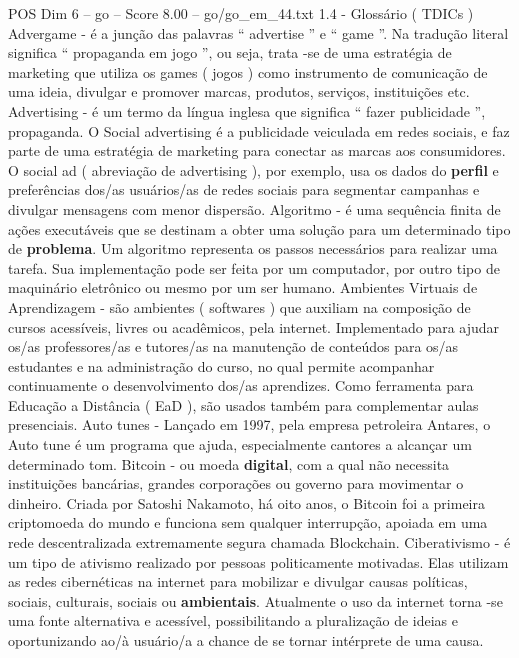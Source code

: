 \begin{textsample}{POS Dim 6 – go – Score 8.00 – go/go\_em\_44.txt}  \label{ex:f6_pos_116}
1.4 - Glossário ( TDICs ) Advergame - é a junção das palavras “ advertise ” e “ game ”.
Na tradução literal significa “ propaganda em jogo ”, ou seja, trata -se de uma estratégia de marketing que utiliza os games ( jogos ) como instrumento de comunicação de uma ideia, divulgar e promover marcas, produtos, serviços, instituições etc.
Advertising - é um termo da língua inglesa que significa “ fazer publicidade ”, propaganda.
O Social advertising é a publicidade veiculada em redes sociais, e faz parte de uma estratégia de marketing para conectar as marcas aos consumidores.
O social ad ( abreviação de advertising ), por exemplo, usa os dados do \textbf{perfil} e preferências dos/as usuários/as de redes sociais para segmentar campanhas e divulgar mensagens com menor dispersão.
Algoritmo - é uma sequência finita de ações executáveis que se destinam a obter uma solução para um determinado tipo de \textbf{problema}.
Um algoritmo representa os passos necessários para realizar uma tarefa.
Sua implementação pode ser feita por um computador, por outro tipo de maquinário eletrônico ou mesmo por um ser humano.
Ambientes Virtuais de Aprendizagem - são ambientes ( softwares ) que auxiliam na composição de cursos acessíveis, livres ou acadêmicos, pela internet.
Implementado para ajudar os/as professores/as e tutores/as na manutenção de conteúdos para os/as estudantes e na administração do curso, no qual permite acompanhar continuamente o desenvolvimento dos/as aprendizes.
Como ferramenta para Educação a Distância ( EaD ), são usados também para complementar aulas presenciais.
Auto tunes - Lançado em 1997, pela empresa petroleira Antares, o Auto tune é um programa que ajuda, especialmente cantores a alcançar um determinado tom.
Bitcoin - ou moeda \textbf{digital}, com a qual não necessita instituições bancárias, grandes corporações ou governo para movimentar o dinheiro.
Criada por Satoshi Nakamoto, há oito anos, o Bitcoin foi a primeira criptomoeda do mundo e funciona sem qualquer interrupção, apoiada em uma rede descentralizada extremamente segura chamada Blockchain.
Ciberativismo - é um tipo de ativismo realizado por pessoas politicamente motivadas.
Elas utilizam as redes cibernéticas na internet para mobilizar e divulgar causas políticas, sociais, culturais, sociais ou \textbf{ambientais}.
Atualmente o uso da internet torna -se uma fonte alternativa e acessível, possibilitando a pluralização de ideias e oportunizando ao/à usuário/a a chance de se tornar intérprete de uma causa.

\end{textsample}

